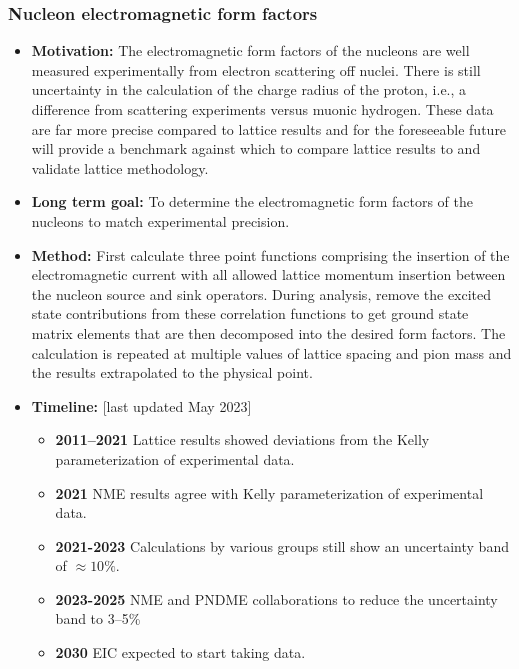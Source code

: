 \documentclass[12pt,hyperpdf]{article}
\begin{document}
\subsubsection{Nucleon electromagnetic form factors}
\begin{itemize}
    \item{\bf Motivation:} The electromagnetic form factors of the nucleons are well measured experimentally from electron 
      scattering off nuclei.  There is still uncertainty in the calculation of the charge radius of the proton, i.e., 
      a difference from scattering experiments versus muonic hydrogen.  These data are far more precise compared to 
      lattice results and for the foreseeable future will provide a benchmark against which to compare lattice results to 
      and validate lattice methodology. 
    \item{\bf Long term goal:} To determine the electromagnetic form factors of the nucleons to match experimental precision. 
    \item{\bf Method:} First calculate three point functions comprising the insertion of the electromagnetic current
      with all allowed lattice momentum insertion between the nucleon source and sink operators. During analysis, remove 
      the excited state contributions from these correlation functions to get ground state matrix elements that are 
      then decomposed into the desired form factors. The calculation is repeated at multiple values of lattice spacing and 
      pion mass and the results extrapolated to the physical point. 
\item{\bf Timeline:} \hfill [last updated May 2023]
\begin{itemize}
    \item{\bf 2011--2021} Lattice results showed deviations from the Kelly parameterization of experimental data. 
    \item{\bf 2021} NME results agree with Kelly parameterization of experimental data.
    \item{\bf 2021-2023} Calculations by various groups still show an uncertainty band of $\approx 10\%$.
    \item{\bf 2023-2025} NME and PNDME collaborations to reduce the uncertainty band to 3--5\%
    \item{\bf 2030} EIC expected to start taking data.
\end{itemize}
\end{itemize}

\end{document}
